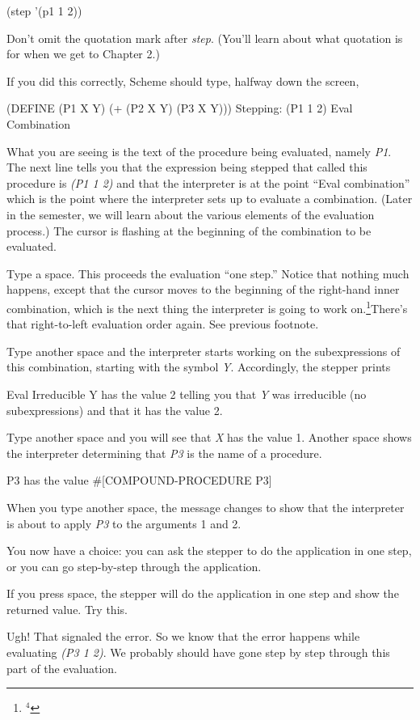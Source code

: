 \beginlisp
(step '(p1 1 2))
\endlisp

Don't omit the quotation mark after {\it step}.   (You'll learn
about what quotation is for when we get to Chapter 2.)

If you did this correctly, Scheme should type, halfway down the screen,
\beginlisp

(DEFINE (P1 X Y) (+ (P2 X Y) (P3 X Y)))
Stepping: (P1 1 2) Eval Combination
\endlisp

What you are seeing is the text of the procedure being evaluated,
namely {\it P1}.  The next line tells you that the expression being
stepped that called this procedure is {\it (P1 1 2)} and that the
interpreter is at the point ``Eval combination'' which is the
point where the interpreter sets up to evaluate a
combination.  (Later in the semester, we will learn about the
various elements of the evaluation process.)  The cursor is
flashing at the beginning of the combination to be evaluated.

Type a space.  This proceeds the evaluation ``one step.''  Notice
that nothing much happens, except that the cursor moves to the
beginning of the right-hand inner combination, which is the next
thing the interpreter is going to work on.\footnote{$^4$}{There's that right-to-left
evaluation order again.  See previous footnote.}

Type another space and the interpreter starts working on the
subexpressions of this combination, starting with the symbol {\it Y}.
Accordingly, the stepper prints
\beginlisp

Eval Irreducible
Y has the value
2
\endlisp
telling you that {\it Y} was irreducible (no subexpressions) and
that it has the value 2.

Type another space and you will see that {\it X} has the value 1.
Another space shows the interpreter determining that {\it P3} is the
name of a procedure.
\beginlisp

P3 has the value
\#[COMPOUND-PROCEDURE P3]
\endlisp

When you type another space, the message changes to show that the
interpreter is about to apply {\it P3} to the arguments 1 and 2.

You now have a choice: you can ask the stepper to do the
application in one step, or you can go step-by-step through the
application.

If you press space, the stepper will do the application in one step and
show the returned value.  Try this.

Ugh!  That signaled the error.  So we know that the error happens
while evaluating {\it (P3 1 2)}.  We probably should have gone step
by step through this part of the evaluation.

